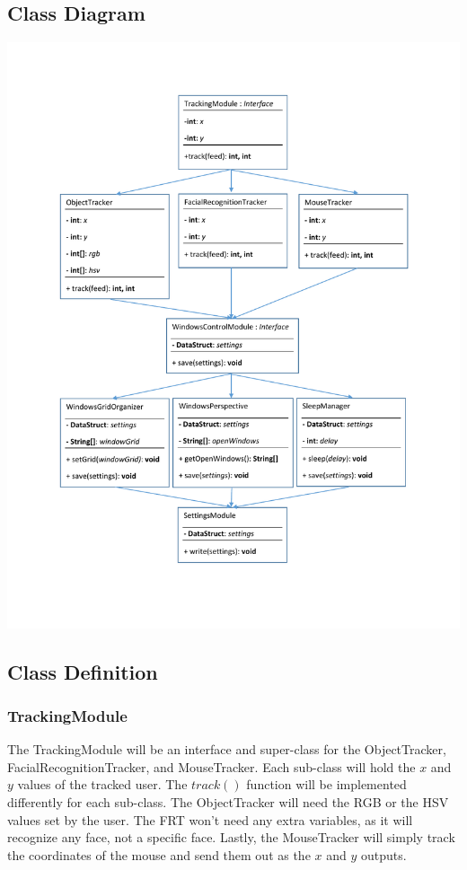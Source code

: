 \documentclass[titlepage]{article}
\begin{document}
\subsection{Class Diagram}
\begin{center}
	\includegraphics[width=\textwidth,height=.92\textheight,keepaspectratio]{decomposition_description.pdf}
\end{center}

\subsection{Class Definition}
\subsubsection{TrackingModule}
The TrackingModule will be an interface and super-class for the ObjectTracker, FacialRecognitionTracker, and MouseTracker. Each sub-class will hold the $x$ and $y$ values of the tracked user. The $track()$ function will be implemented differently for each sub-class. The ObjectTracker will need the RGB or the HSV values set by the user. The FRT won't need any extra variables, as it will recognize any face, not a specific face. Lastly, the MouseTracker will simply track the coordinates of the mouse and send them out as the $x$ and $y$ outputs.
\end{document}
